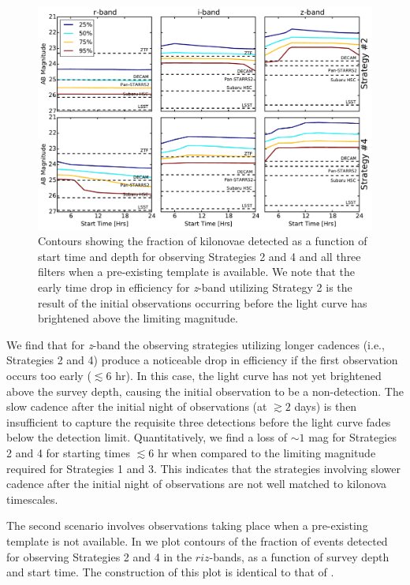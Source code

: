 \begin{figure}[t!]
\centering
\includegraphics[width=\textwidth]{./figs/chapter2/f18.pdf}
\caption{\singlespace Contours showing the fraction of kilonovae detected as a function of start time and depth for observing Strategies 2 and 4 and all three filters when a pre-existing template is available. We note that the early time drop in efficiency for {\em z}-band utilizing Strategy 2 is the result of the initial observations occurring before the light curve has brightened above the limiting magnitude.}
\label{fig:ch2_det_24}
\end{figure}
 
 We find that for {\em z}-band the observing strategies utilizing longer cadences (i.e., Strategies 2 and 4) produce a noticeable drop in efficiency if the first observation occurs too early ($\lesssim 6$ hr). In this case, the light curve has not yet brightened above the survey depth, causing the initial observation to be a non-detection. The slow cadence after the initial night of observations (at $\gtrsim2$ days) is then insufficient to capture the requisite three detections before the light curve fades below the detection limit. Quantitatively, we find a loss of $\sim 1$ mag for Strategies 2 and 4 for starting times $\lesssim 6$ hr when compared to the limiting magnitude required for Strategies 1 and 3. This indicates that the strategies involving slower cadence after the initial night of observations are not well matched to kilonova timescales. 

The second scenario involves observations taking place when a pre-existing template is not available. In  we plot contours of the fraction of events detected for observing Strategies 2 and 4 in the $riz$-bands, as a function of survey depth and start time. The construction of this plot is identical to that of .

